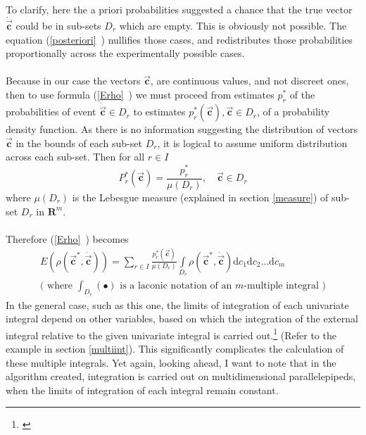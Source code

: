 \documentclass[11pt,a4paper]{article}
\numberwithin{equation}{subsection}
\newcommand{\vecc}{\vec{\textbf{c}}}
\begin{document}
To clarify, here the a priori probabilities suggested a chance that the true vector $\dot{\vecc}$ could be in sub-sets $D_{r}$ which are empty. This is obviously not possible. The equation (\vref{posteriori}~) nullifies those cases, and redistributes those probabilities proportionally across the experimentally possible cases.\\
\\
Because in our case the vectors $\vecc$, are continuous values, and not discreet ones, then to use formula (\vref{Erho}~) we must proceed from estimates $p_{r}^{*}$ of the probabilities of event $\dot{\vecc} \in D_{r}$ to estimates $p_{r}^{*}(\vecc), \vecc \in D_{r}$, of a probability density function. As there is no information suggesting the distribution of vectors $\vecc$ in the bounds of each sub-set $D_{r}$, it is logical to assume uniform distribution across each sub-set. Then for all $r \in I$
\begin{equation}
P_{r}^{*}(\vecc)=\frac{p_{r}^{*}}{\mu(D_{r})}, \quad \vecc \in D_{r} \label{posteriori}
\end{equation}
where $\mu(D_{r})$ is the Lebesgue measure (explained in section \vref{measure}) of sub-set $D_{r}$ in $\boldsymbol{R}^{m}$. \\
\\
Therefore (\vref{Erho}~) becomes
\begin{gather}
E(\rho(\vecc^{*},\dot{\vecc}))=\sum\limits_{r \in I} \frac{p_{r}^{*}(\vecc)}{\mu(D_{r})} \int\limits_{D_{r}}\rho(\vecc^{*},\dot{\vecc})\mathrm{d}c_{1}\mathrm{d}c_{2}\dots \mathrm{d}c_{m} \label{mathexpectancy}\\
\nonumber
\text{( where $\int_ {D_{r}}(\bullet)$ is a laconic notation of an $m$-multiple integral )}
\end{gather}
In the general case, such as this one, the limits of integration of each univariate integral depend on other variables, based on which the integration of the external integral relative to the given univariate integral is carried out.\footnote{\cite{stewart_2008_int}} (Refer to the example in section \vref{multiint}). This significantly complicates the calculation of these multiple integrals. Yet again, looking ahead, I want to note that in the algorithm created, integration is carried out on multidimensional parallelepipeds, when the limits of integration of each integral remain constant.
\end{document}
